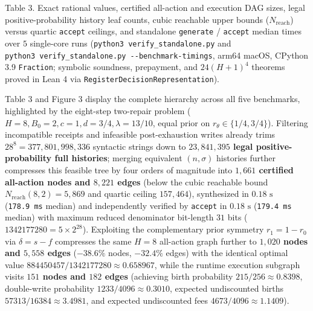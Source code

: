 \documentclass[11pt,a4paper]{article}
\begin{document}
Table 3. Exact rational values, certified all-action and execution DAG
sizes, legal positive-probability history leaf counts, cubic reachable
upper bounds (\(N_{\mathrm{reach}}\)) versus quartic \texttt{accept}
ceilings, and standalone \texttt{generate} / \texttt{accept} median
times over \(5\) single-core runs
(\texttt{python3\ verify\_standalone.py} and
\texttt{python3\ verify\_standalone.py\ -\/-benchmark-timings}, arm64
macOS, CPython 3.9 \texttt{Fraction}; symbolic soundness, prepayment,
and \(24(H+1)^4\) theorems proved in Lean 4 via
\texttt{RegisterDecisionRepresentation}).

Table 3 and Figure 3 display the complete hierarchy across all five
benchmarks, highlighted by the eight-step two-repair problem
(\(H = 8, B_0 = 2, c = 1, d = 3/4, \lambda = 13/10\), equal prior on
\(r_\theta \in \{1/4, 3/4\}\)). Filtering incompatible receipts and
infeasible post-exhaustion writes already trims
\(28^8 = 377,801,998,336\) syntactic strings down to
\textbf{\(23,841,395\) legal positive-probability full histories};
merging equivalent \((n, \sigma)\) histories further compresses this
feasible tree by four orders of magnitude into \textbf{\(1,661\)
certified all-action nodes and \(8,221\) edges} (below the cubic
reachable bound \(N_{\mathrm{reach}}(8, 2) = 5,869\) and quartic ceiling
\(157,464\)), synthesized in \(0.18\text{ s}\) (\texttt{178.9\ ms}
median) and independently verified by \texttt{accept} in
\(0.18\text{ s}\) (\texttt{179.4\ ms} median) with maximum reduced
denominator bit-length \(31\) bits (\(1342177280 = 5 \times 2^{28}\)).
Exploiting the complementary prior symmetry \(r_1 = 1 - r_0\) via
\(\delta = s - f\) compresses the same \(H = 8\) all-action graph
further to \textbf{\(1,020\) nodes and \(5,558\) edges} (\(-38.6\%\)
nodes, \(-32.4\%\) edges) with the identical optimal value
\(884450457 / 1342177280 \approx 0.658967\), while the runtime execution
subgraph visits \textbf{\(151\) nodes and \(182\) edges} (achieving
birth probability \(215 / 256 \approx 0.8398\), double-write probability
\(1233 / 4096 \approx 0.3010\), expected undiscounted births
\(57313 / 16384 \approx 3.4981\), and expected undiscounted fees
\(4673 / 4096 \approx 1.1409\)).
\end{document}

